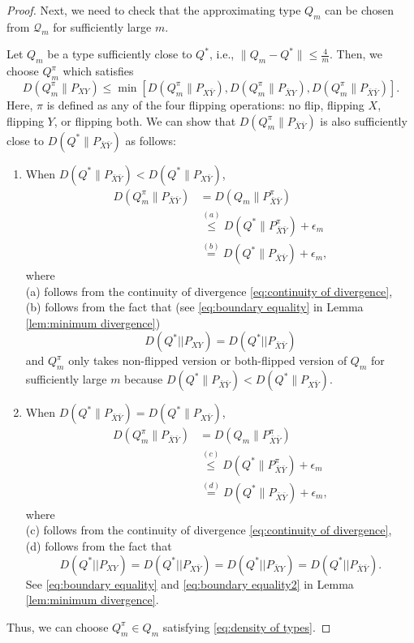 \documentclass[journal,onecolumn]{IEEEtran}
\theoremstyle{definition}
\theoremstyle{remark}
\newcommand{\Pxy}{P_{XY}}
\newcommand{\Pxby}{P_{X\bar{Y}}}
\newcommand{\Pbxy}{P_{\bar{X}Y}}
\newcommand{\Pbxby}{P_{\bar{X}\bar{Y}}}
\begin{document}
\begin{proof}
    Next, we need to check that the approximating type $Q_m$ can be chosen
    from $\mathcal{Q}_m$ for sufficiently large $m$.



    Let $Q_m$ be a type sufficiently close to $Q^\ast$, i.e., $\|Q_m - Q^\ast\| \leq \frac{4}{m}$.
    Then, we choose $Q_m^\pi$ which satisfies \[D(Q_m^\pi\|\Pxy) \leq \min[D(Q_m^\pi\|\Pxby), D(Q_m^\pi\|\Pbxy), D(Q_m^\pi\|\Pbxby)].\]
    Here, $\pi$ is defined as any of the four flipping operations: no flip, flipping $X$, flipping $Y$, or flipping both.
    We can show that $D(Q_m^\pi\|\Pbxby)$ is also sufficiently close to $D(Q^\ast\|\Pbxby)$ as follows:
    \begin{enumerate}
        \item When $D(Q^\ast \| \Pbxby) < D(Q^\ast \| \Pxby)$,
        \begin{align*}
            D(Q_m^\pi\| \Pbxby) &= D(Q_m\| \Pbxby^\pi) \\
            &\overset{(a)}{\leq} D(Q^\ast \| \Pbxby^\pi) + \epsilon_m \\
            &\overset{(b)}{=} D(Q^\ast \| \Pbxby) + \epsilon_m,
        \end{align*}
        where \\
        (a) follows from the continuity of divergence \eqref{eq:continuity of divergence},\\
        (b) follows from the fact that (see \eqref{eq:boundary equality} in Lemma \ref{lem:minimum divergence})\[D(Q^\ast||\Pxy) = D(Q^\ast||\Pbxby)\]
        and $Q_m^\pi$ only takes non-flipped version or both-flipped version of $Q_m$ for sufficiently large $m$
        because $D(Q^\ast \| \Pbxby) < D(Q^\ast \| \Pxby)$.
        
        \item When $D(Q^\ast \| \Pbxby) = D(Q^\ast \| \Pxby)$,
        \begin{align*}
            D(Q_m^\pi\| \Pbxby) &= D(Q_m\| \Pbxby^\pi) \\
            &\overset{(c)}{\leq} D(Q^\ast \| \Pbxby^\pi) + \epsilon_m \\
            &\overset{(d)}{= } D(Q^\ast \| \Pbxby) + \epsilon_m,
        \end{align*}
        where \\
        (c) follows from the continuity of divergence \eqref{eq:continuity of divergence},\\
        (d) follows from the fact that \[D(Q^\ast||\Pxy) =D(Q^\ast||\Pxby)=D(Q^\ast||\Pbxy)=D(Q^\ast||\Pbxby).\]
        See \eqref{eq:boundary equality} and \eqref{eq:boundary equality2} in Lemma \ref{lem:minimum divergence}.
    \end{enumerate}
    Thus, we can choose $Q_m^\pi\in Q_m$ satisfying \eqref{eq:density of types}.
    \end{proof}
\end{document}
